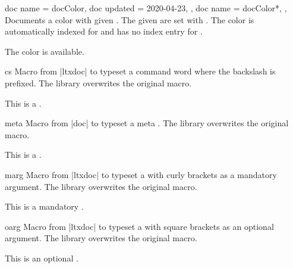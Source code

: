 \begin{docCommands}[doc parameter=\oarg{options}\marg{name}]
  {
    {
      doc name    = docColor,
      doc updated = 2020-04-23,
    },
    {
      doc name = docColor*,
    },
  }
  Documents a color with given .
  The given  are set with .
  The color is automatically indexed for 
  and has no index entry for .
\begin{dispExample}
The color  is available.
\end{dispExample}
\end{docCommands}



\begin{docCommand}{cs}{}
  Macro from |ltxdoc| \cite{carlisle:ltxdoc} to typeset a command word 
  where the backslash is prefixed. The library overwrites the original macro.
\begin{dispExample}
This is a .
\end{dispExample}
\end{docCommand}

\begin{docCommand}{meta}{}
  Macro from |doc| \cite{mittelbach:2011a} to typeset a meta .
  The library overwrites the original macro.
\begin{dispExample}
This is a .
\end{dispExample}
\end{docCommand}


\begin{docCommand}{marg}{}
  Macro from |ltxdoc| \cite{carlisle:ltxdoc} to typeset a  with
  curly brackets as a mandatory argument. The library overwrites the original macro.
\begin{dispExample}
This is a mandatory .
\end{dispExample}
\end{docCommand}

\begin{docCommand}{oarg}{}
  Macro from |ltxdoc| \cite{carlisle:ltxdoc} to typeset a  with
  square brackets as an optional argument. The library overwrites the original macro.
\begin{dispExample}
This is an optional .
\end{dispExample}
\end{docCommand}

